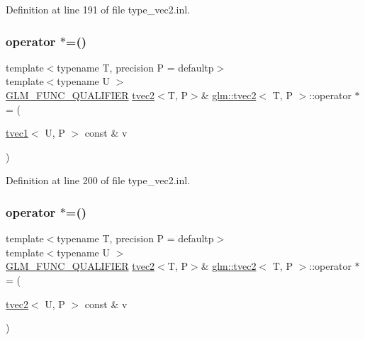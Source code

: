 Definition at line 191 of file type\+\_\+vec2.\+inl.

\mbox{\label{structglm_1_1tvec2_a41b653c5ebb130acb642092aeb22d10a}} 
\subsubsection{\texorpdfstring{operator $\ast$=()}{operator *=()}\hspace{0.1cm}{\footnotesize\ttfamily [5/6]}}
{\footnotesize\ttfamily template$<$typename T, precision P = defaultp$>$ \\
template$<$typename U $>$ \\
\mbox{\hyperlink{setup_8hpp_a33fdea6f91c5f834105f7415e2a64407}{G\+L\+M\+\_\+\+F\+U\+N\+C\+\_\+\+Q\+U\+A\+L\+I\+F\+I\+ER}} \mbox{\hyperlink{structglm_1_1tvec2}{tvec2}}$<$T, P$>$\& \mbox{\hyperlink{structglm_1_1tvec2}{glm\+::tvec2}}$<$ T, P $>$\+::operator $\ast$= (\begin{DoxyParamCaption}\item[{\mbox{\hyperlink{structglm_1_1tvec1}{tvec1}}$<$ U, P $>$ const \&}]{v }\end{DoxyParamCaption})}



Definition at line 200 of file type\+\_\+vec2.\+inl.

\mbox{\label{structglm_1_1tvec2_a2aa935237d57dceed6e47dfb9c8247df}} 
\subsubsection{\texorpdfstring{operator $\ast$=()}{operator *=()}\hspace{0.1cm}{\footnotesize\ttfamily [6/6]}}
{\footnotesize\ttfamily template$<$typename T, precision P = defaultp$>$ \\
template$<$typename U $>$ \\
\mbox{\hyperlink{setup_8hpp_a33fdea6f91c5f834105f7415e2a64407}{G\+L\+M\+\_\+\+F\+U\+N\+C\+\_\+\+Q\+U\+A\+L\+I\+F\+I\+ER}} \mbox{\hyperlink{structglm_1_1tvec2}{tvec2}}$<$T, P$>$\& \mbox{\hyperlink{structglm_1_1tvec2}{glm\+::tvec2}}$<$ T, P $>$\+::operator $\ast$= (\begin{DoxyParamCaption}\item[{\mbox{\hyperlink{structglm_1_1tvec2}{tvec2}}$<$ U, P $>$ const \&}]{v }\end{DoxyParamCaption})}



